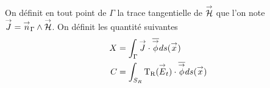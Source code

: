 

  On définit en tout point de \(\Gamma\) la trace tangentielle de \(\vH\) que l'on note \(\vJ = \vn_\Gamma \pvect \vH\). On définit les quantité suivantes
  \begin{align}
    X &= \int_\Gamma \vJ \cdot \conj{\vect \phi} ds(\vx)
    \\
    C &= \int_{S_R} \Tr(\vE_t)  \cdot \conj{\vect \phi} ds(\vx)
  \end{align}








